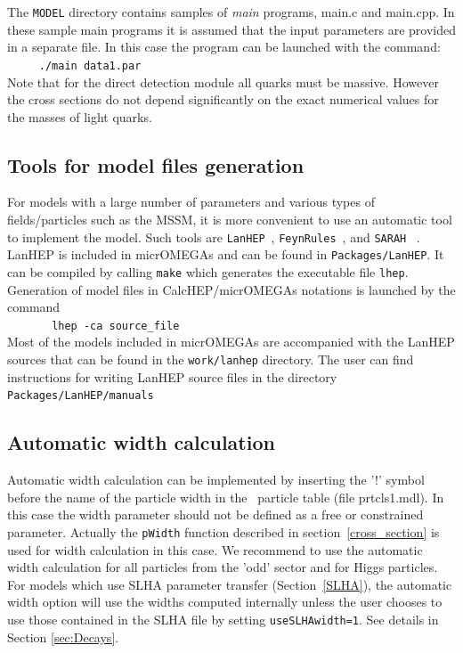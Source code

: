 \documentclass[12pt,a4paper]{article}
\begin{document}
The {\tt MODEL} directory contains  samples of {\it main}
programs, main.c and main.cpp. In these sample main programs it is assumed that the input parameters are provided in a separate
file. In this case the  program can be launched with the command:\\
\verb|     ./main data1.par|\\
Note that for the direct detection module all quarks must be  massive. 
However the cross sections do not depend significantly on the exact  
numerical values for the masses of light quarks.

\subsection{Tools  for model files generation}

For models with a large number of parameters and various types of fields/particles such as  the MSSM, it is more convenient to use an automatic tool to implement  the model. 
Such tools are 
 \texttt{LanHEP}~\cite{Semenov:2014rea}, \texttt{FeynRules}~\cite{Alloul_2014}, and \texttt{SARAH}~\cite{Staub_2013} .  
 LanHEP is included in micrOMEGAs and can be found in {\tt Packages/LanHEP}.  It can be compiled by calling {\tt make} which generates the executable file {\tt lhep}.    Generation of  model files in CalcHEP/micrOMEGAs notations is launched  by the command \\
   \verb|       lhep -ca source_file|\\
  Most of the models included  in micrOMEGAs are accompanied with the LanHEP  sources that can be found in the  {\tt work/lanhep}  directory.
  The user can find instructions for writing  LanHEP source files in the directory \verb|Packages/LanHEP/manuals|\\ 
    
\subsection{Automatic width calculation}
Automatic width calculation can be 
implemented by  inserting the '!' symbol before the name of the particle width  in 
the \calchep\ particle table (file prtcls1.mdl). In this case the width parameter 
should not be defined as a free or constrained parameter. 
Actually the \verb|pWidth| function  described in section~\ref{cross_section} is  used for width calculation in this case.
We recommend to use the
automatic width calculation for all particles from the 'odd' sector and for
Higgs particles. 
For models which use SLHA parameter transfer (Section~\ref{SLHA}), 
the automatic width option will use the widths computed internally unless the user chooses to use those contained  in the SLHA file  by setting {\tt useSLHAwidth=1}. 
See details in Section \ref{sec:Decays}.
\end{document}
